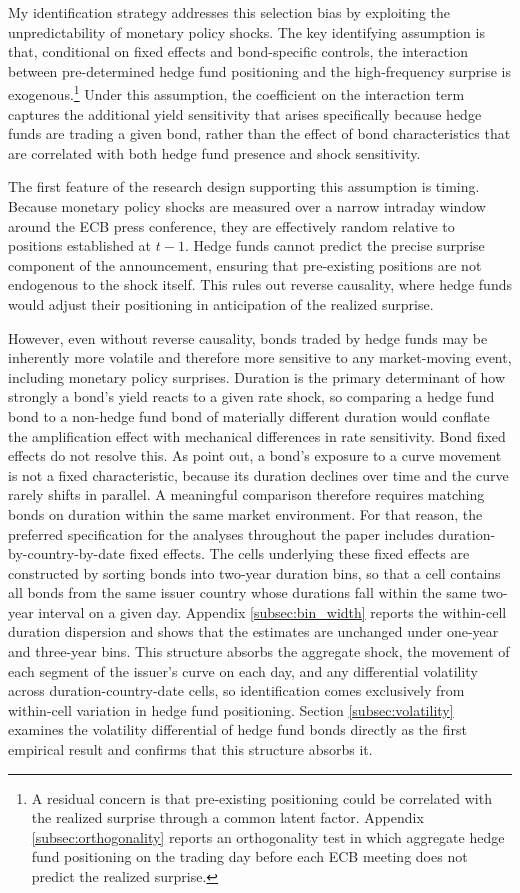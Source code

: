 \documentclass[english, 11pt, oneside]{article}
\begin{document}
My identification strategy addresses this selection bias by exploiting the unpredictability of monetary policy shocks. The key identifying assumption is that, conditional on fixed effects and bond-specific controls, the interaction between pre-determined hedge fund positioning and the high-frequency surprise is exogenous.\footnote{A residual concern is that pre-existing positioning could be correlated with the realized surprise through a common latent factor. Appendix \ref{subsec:orthogonality} reports an orthogonality test in which aggregate hedge fund positioning on the trading day before each ECB meeting does not predict the realized surprise.} Under this assumption, the coefficient on the interaction term captures the additional yield sensitivity that arises specifically because hedge funds are trading a given bond, rather than the effect of bond characteristics that are correlated with both hedge fund presence and shock sensitivity.

The first feature of the research design supporting this assumption is timing. Because monetary policy shocks are measured over a narrow intraday window around the ECB press conference, they are effectively random relative to positions established at $t{-}1$. Hedge funds cannot predict the precise surprise component of the announcement, ensuring that pre-existing positions are not endogenous to the shock itself. This rules out reverse causality, where hedge funds would adjust their positioning in anticipation of the realized surprise.

However, even without reverse causality, bonds traded by hedge funds may be inherently more volatile and therefore more sensitive to any market-moving event, including monetary policy surprises. Duration is the primary determinant of how strongly a bond's yield reacts to a given rate shock, so comparing a hedge fund bond to a non-hedge fund bond of materially different duration would conflate the amplification effect with mechanical differences in rate sensitivity. Bond fixed effects do not resolve this. As \citet{nyborg2025} point out, a bond's exposure to a curve movement is not a fixed characteristic, because its duration declines over time and the curve rarely shifts in parallel. A meaningful comparison therefore requires matching bonds on duration within the same market environment.
For that reason, the preferred specification for the analyses throughout the paper includes duration-by-country-by-date fixed effects. The cells underlying these fixed effects are constructed by sorting bonds into two-year duration bins, so that a cell contains all bonds from the same issuer country whose durations fall within the same two-year interval on a given day. Appendix \ref{subsec:bin_width} reports the within-cell duration dispersion and shows that the estimates are unchanged under one-year and three-year bins. This structure absorbs the aggregate shock, the movement of each segment of the issuer's curve on each day, and any differential volatility across duration-country-date cells, so identification comes exclusively from within-cell variation in hedge fund positioning. Section \ref{subsec:volatility} examines the volatility differential of hedge fund bonds directly as the first empirical result and confirms that this structure absorbs it.
\end{document}
